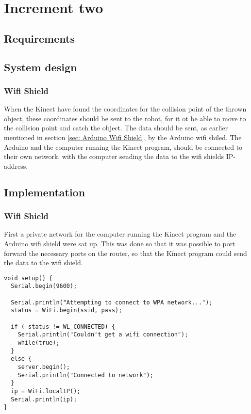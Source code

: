 \chapter{Increment two}
\label{chap:Increment two}

\section{Requirements}
\label{sec:i2Requirements}

\section{System design}
\label{sec:i2System design}

\subsection{Wifi Shield}
\label{sec:Wifi Shield SD}
When the Kinect have found the coordinates for the collision point of the thrown object, these coordinates should be sent to the robot, for it ot be able to move to the collision point and catch the object. 
The data should be sent, as earlier mentioned in section \ref{sec: Arduino Wifi Shield}, by the Arduino wifi shiled. The Arduino and the computer running the Kinect program, should be connected to their own network, with the computer sending the data to the wifi shields IP-address.

\section{Implementation}
\label{sec:i2Implementation}

\subsection{Wifi Shield}
\label{sec:Wifi Shield Implementation}
First a private network for the computer running the Kinect program and the Arduino wifi shield were sat up. This was done so that it was possible to port forward the necessary ports on the router, so that the Kinect program could send the data to the wifi shield.

\begin{lstlisting}[caption={Connecting the Wifi shield to the network}, label={ws}]
void setup() {
  Serial.begin(9600);

  Serial.println("Attempting to connect to WPA network...");
  status = WiFi.begin(ssid, pass);

  if ( status != WL_CONNECTED) { 
    Serial.println("Couldn't get a wifi connection");
    while(true);
  } 
  else {
    server.begin();
    Serial.println("Connected to network");
  }
  ip = WiFi.localIP();
  Serial.println(ip);
}
\end{lstlisting}

